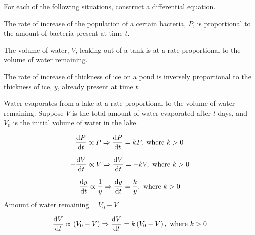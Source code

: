 \documentclass[11pt,a4paper]{book}
\begin{document}
\begin{example}

For each of the following situations, construct a differential equation.

\begin{tasks}[label=(\alph*),label-width=3.5ex]

\task  The rate of increase of the population of a certain bacteria,
$P$, is proportional to the amount of bacteria present at time $t$.

\task  The volume of water, $V$, leaking out of a tank is at a rate
proportional to the volume of water remaining.

\task  The rate of increase of thickness of ice on a pond is inversely
proportional to the thickness of ice, $y$, already present at time
$t$.

\task  Water evaporates from a lake at a rate proportional to the
volume of water remaining. Suppose $V$ is the total amount of water
evaporated after $t$ days, and $V_{0}$ is the initial volume of
water in the lake.

\end{tasks}

\Solution

\begin{tasks}[label=(\alph*),label-width=3.5ex]

\task
\[
\frac{{\rm d}P}{{\rm d}t}\propto P\Rightarrow\frac{{\rm d}P}{{\rm d}t}=kP,\text{ where }k>0
\]

\task
\[
-\frac{{\rm d}V}{{\rm d}t}\propto V\Rightarrow\frac{{\rm d}V}{{\rm d}t}=-kV,\text{ where }k>0
\]

\task
\[
\frac{{\rm d}y}{{\rm d}t}\propto\frac{1}{y}\Rightarrow\frac{{\rm d}y}{{\rm d}t}=\frac{k}{y},\text{ where }k>0
\]

\task  $\text{Amount of water remaining}=V_{0}-V$

\[
\frac{{\rm d}V}{{\rm d}t}\propto\left(V_{0}-V\right)\Rightarrow\frac{{\rm d}V}{{\rm d}t}=k\left(V_{0}-V\right),\text{ where }k>0
\]

\end{tasks}

\end{example}

\newpage
\end{document}
